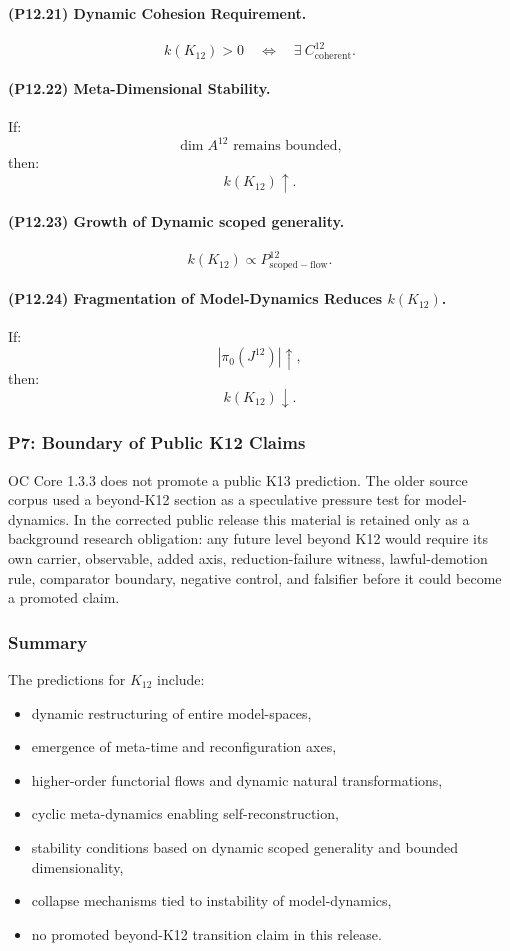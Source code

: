 \paragraph{(P12.21) Dynamic Cohesion Requirement.}
\[
k(K_{12}) > 0
\quad\Leftrightarrow\quad
\exists\ C^{12}_{\mathrm{coherent}}.
\]

\paragraph{(P12.22) Meta-Dimensional Stability.}
If:
\[
\dim A^{12} \text{ remains bounded},
\]
then:
\[
k(K_{12}) \uparrow.
\]

\paragraph{(P12.23) Growth of Dynamic scoped generality.}
\[
k(K_{12}) \propto P_{\mathrm{scoped-flow}}^{12}.
\]

\paragraph{(P12.24) Fragmentation of Model-Dynamics Reduces $k(K_{12})$.}
If:
\[
|\pi_0(J^{12})| \uparrow,
\]
then:
\[
k(K_{12}) \downarrow.
\]

\subsubsection{P7: Boundary of Public K12 Claims}

OC Core 1.3.3 does not promote a public K13 prediction. The older source corpus used a beyond-K12 section as a speculative pressure test for model-dynamics. In the corrected public release this material is retained only as a background research obligation: any future level beyond K12 would require its own carrier, observable, added axis, reduction-failure witness, lawful-demotion rule, comparator boundary, negative control, and falsifier before it could become a promoted claim.

\subsubsection{Summary}

The predictions for $K_{12}$ include:
\begin{itemize}
    \item dynamic restructuring of entire model-spaces,
    \item emergence of meta-time and reconfiguration axes,
    \item higher-order functorial flows and dynamic natural transformations,
    \item cyclic meta-dynamics enabling self-reconstruction,
    \item stability conditions based on dynamic scoped generality and bounded dimensionality,
    \item collapse mechanisms tied to instability of model-dynamics,
    \item no promoted beyond-K12 transition claim in this release.
\end{itemize}
